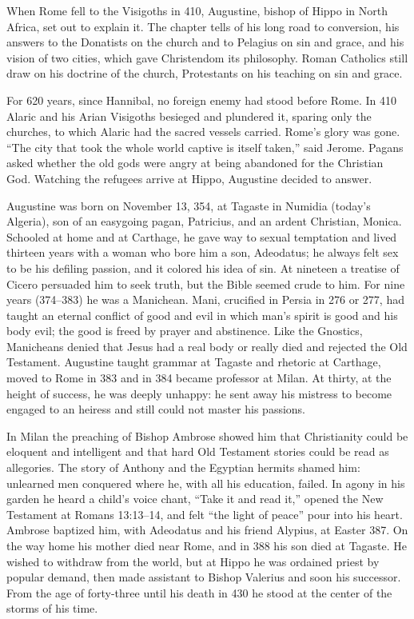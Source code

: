 
\begin{inbrief}
When Rome fell to the Visigoths in 410, Augustine, bishop of Hippo in North Africa, set out to explain
it. The chapter tells of his long road to conversion, his answers to the Donatists on the church and
to Pelagius on sin and grace, and his vision of two cities, which gave Christendom its philosophy.
Roman Catholics still draw on his doctrine of the church, Protestants on his teaching on sin and grace.
\end{inbrief}

For 620 years, since Hannibal, no foreign enemy had stood before Rome. In 410 Alaric and his Arian
Visigoths besieged and plundered it, sparing only the churches, to which Alaric had the sacred vessels
carried. Rome's glory was gone. ``The city that took the whole world captive is itself taken,'' said
Jerome. Pagans asked whether the old gods were angry at being abandoned for the Christian God.
Watching the refugees arrive at Hippo, Augustine decided to answer.

Augustine was born on November 13, 354, at Tagaste in Numidia (today's Algeria), son of an easygoing
pagan, Patricius, and an ardent Christian, Monica. Schooled at home and at Carthage, he gave way to
sexual temptation and lived thirteen years with a woman who bore him a son, Adeodatus; he always felt
sex to be his defiling passion, and it colored his idea of sin. At nineteen a treatise of Cicero
persuaded him to seek truth, but the Bible seemed crude to him. For nine years (374--383) he was a
Manichean. Mani, crucified in Persia in 276 or 277, had taught an eternal conflict of good and evil in
which man's spirit is good and his body evil; the good is freed by prayer and abstinence. Like the
Gnostics, Manicheans denied that Jesus had a real body or really died and rejected the Old Testament.
Augustine taught grammar at Tagaste and rhetoric at Carthage, moved to Rome in 383 and in 384 became
professor at Milan. At thirty, at the height of success, he was deeply unhappy: he sent away his
mistress to become engaged to an heiress and still could not master his passions.

In Milan the preaching of Bishop Ambrose showed him that Christianity could be eloquent and
intelligent and that hard Old Testament stories could be read as allegories. The story of Anthony and
the Egyptian hermits shamed him: unlearned men conquered where he, with all his education, failed. In
agony in his garden he heard a child's voice chant, ``Take it and read it,'' opened the New Testament
at Romans 13:13--14, and felt ``the light of peace'' pour into his heart. Ambrose baptized him, with
Adeodatus and his friend Alypius, at Easter 387. On the way home his mother died near Rome, and in 388
his son died at Tagaste. He wished to withdraw from the world, but at Hippo he was ordained priest by
popular demand, then made assistant to Bishop Valerius and soon his successor. From the age of
forty-three until his death in 430 he stood at the center of the storms of his time.

